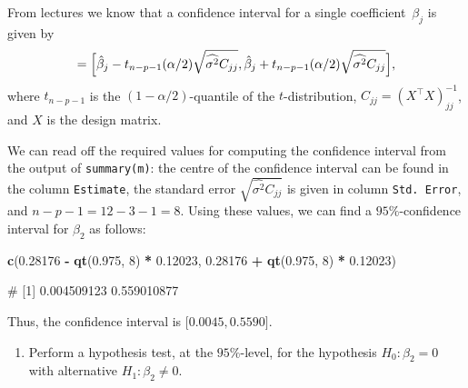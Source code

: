 \documentclass[
  a4paper,
]{article}
\newenvironment{Shaded}{\begin{snugshade}}{\end{snugshade}}
\newcommand{\DecValTok}[1]{\textcolor[rgb]{0.00,0.00,0.81}{#1}}
\newcommand{\FloatTok}[1]{\textcolor[rgb]{0.00,0.00,0.81}{#1}}
\newcommand{\FunctionTok}[1]{\textcolor[rgb]{0.13,0.29,0.53}{\textbf{#1}}}
\newcommand{\NormalTok}[1]{#1}
\newcommand{\SpecialCharTok}[1]{\textcolor[rgb]{0.81,0.36,0.00}{\textbf{#1}}}
\providecommand{\tightlist}{%
  \setlength{\itemsep}{0pt}\setlength{\parskip}{0pt}}
\theoremstyle{definition}
\theoremstyle{definition}
\theoremstyle{definition}
\theoremstyle{definition}
\theoremstyle{remark}
\begin{document}
\begin{myanswers}
From lectures we know that a confidence interval for a single
coefficient~\(\beta_j\) is given by
\begin{equation*}
  [U, V]
  = \Bigl[ \hat\beta_j - t_{n-p-1}(\alpha/2) \sqrt{\widehat{\sigma^2} C_{jj}},
       \hat\beta_j + t_{n-p-1}(\alpha/2) \sqrt{\widehat{\sigma^2} C_{jj}} \Bigr],
\end{equation*}
where \(t_{n-p-1}\) is the \((1-\alpha/2)\)-quantile of the \(t\)-distribution,
\(C_{jj} = (X^\top X)^{-1}_{jj}\), and \(X\) is the design matrix.

We can read off the required values for computing the confidence
interval from the output of \texttt{summary(m)}: the centre of the
confidence interval can be found in the column \texttt{Estimate},
the standard error \(\sqrt{\widehat{\sigma^2} C_{jj}}\) is given in
column \texttt{Std.\ Error}, and \(n-p-1 = 12 - 3 - 1 = 8\). Using
these values, we can find a \(95\%\)-confidence interval for
\(\beta_2\) as follows:

\begin{Shaded}
\begin{Highlighting}[]
  \FunctionTok{c}\NormalTok{(}\FloatTok{0.28176} \SpecialCharTok{{-}} \FunctionTok{qt}\NormalTok{(}\FloatTok{0.975}\NormalTok{, }\DecValTok{8}\NormalTok{) }\SpecialCharTok{*} \FloatTok{0.12023}\NormalTok{, }\FloatTok{0.28176} \SpecialCharTok{+} \FunctionTok{qt}\NormalTok{(}\FloatTok{0.975}\NormalTok{, }\DecValTok{8}\NormalTok{) }\SpecialCharTok{*} \FloatTok{0.12023}\NormalTok{)}
\end{Highlighting}
\end{Shaded}

\begin{Shaded}
\begin{Highlighting}[]
\NormalTok{\# [1] 0.004509123 0.559010877}
\end{Highlighting}
\end{Shaded}

Thus, the confidence interval is \(\bigl[ 0.0045, 0.5590 \bigr]\).

\end{myanswers}

\begin{enumerate}
\def\labelenumi{\alph{enumi}.}
\setcounter{enumi}{2}
\tightlist
\item
  Perform a hypothesis test, at the \(95\%\)-level, for the
  hypothesis \(H_0\colon \beta_2 = 0\) with alternative \(H_1\colon \beta_2 \neq 0\).
\end{enumerate}
\end{document}
